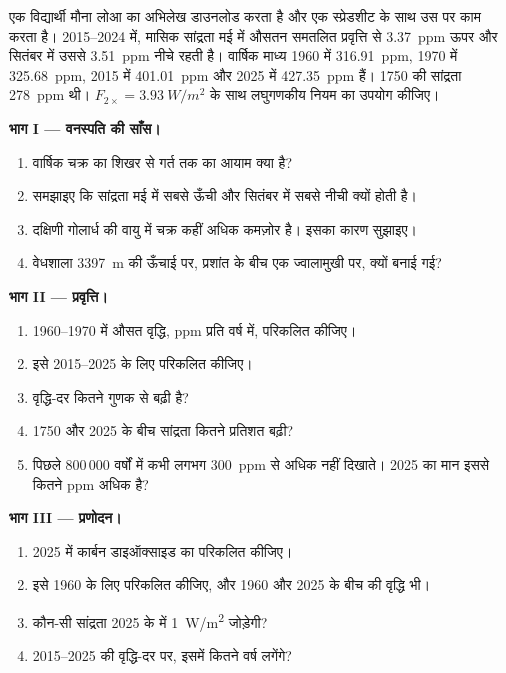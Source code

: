 \begin{problem}
\label{pb:g12:climate-change:1}
एक विद्यार्थी मौना लोआ का अभिलेख डाउनलोड करता है और एक
स्प्रेडशीट के साथ उस पर काम करता है। 2015--2024 में, मासिक सांद्रता मई में औसतन
समतलित प्रवृत्ति से \qty{3.37}{ppm} ऊपर और सितंबर में उससे \qty{3.51}{ppm} नीचे
रहती है। वार्षिक माध्य 1960 में \qty{316.91}{ppm},
1970 में \qty{325.68}{ppm}, 2015 में \qty{401.01}{ppm} और 2025 में \qty{427.35}{ppm}
हैं। 1750 की सांद्रता \qty{278}{ppm} थी। $F_{2\times} = \qty{3.93}{W/m^2}$
के साथ लघुगणकीय नियम का उपयोग कीजिए।

\medskip
\noindent\textbf{भाग I --- वनस्पति की साँस।}
\begin{enumerate}
  \item वार्षिक चक्र का शिखर से गर्त तक का आयाम क्या है?
  \item समझाइए कि सांद्रता मई में सबसे ऊँची और सितंबर में
        सबसे नीची क्यों होती है।
  \item दक्षिणी गोलार्ध की वायु में चक्र कहीं अधिक कमज़ोर है।
        इसका कारण सुझाइए।
  \item वेधशाला \qty{3397}{m} की ऊँचाई पर, प्रशांत के बीच
        एक ज्वालामुखी पर, क्यों बनाई गई?
\end{enumerate}

\medskip
\noindent\textbf{भाग II --- प्रवृत्ति।}
\begin{enumerate}[resume]
  \item 1960--1970 में औसत वृद्धि, ppm प्रति वर्ष में, परिकलित कीजिए।
  \item इसे 2015--2025 के लिए परिकलित कीजिए।
  \item वृद्धि-दर कितने गुणक से बढ़ी है?
  \item 1750 और 2025 के बीच सांद्रता कितने प्रतिशत
        बढ़ी?
  \item {} पिछले 800\,000 वर्षों में कभी लगभग \qty{300}{ppm} से अधिक
        नहीं दिखाते। 2025 का मान इससे कितने ppm
        अधिक है?
\end{enumerate}

\medskip
\noindent\textbf{भाग III --- प्रणोदन।}
\begin{enumerate}[resume]
  \item 2025 में कार्बन डाइऑक्साइड का  परिकलित कीजिए।
  \item इसे 1960 के लिए परिकलित कीजिए, और 1960
        और 2025 के बीच  की वृद्धि भी।
  \item कौन-सी सांद्रता 2025 के  में \qty{1}{W/m^2} जोड़ेगी?
  \item 2015--2025 की वृद्धि-दर पर, इसमें कितने वर्ष लगेंगे?
\end{enumerate}


\end{problem}
